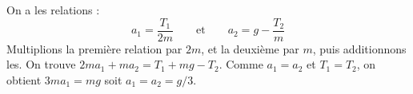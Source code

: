 
\begin{corrige}
	On a les relations : 
	\[a_1=\frac{T_1}{2m}
	\qquad\text{et}\qquad
	a_2=g-\frac{T_2}{m}\]
	Multiplions la première relation par $2m$, et la deuxième par $m$, puis additionnons les. On trouve $2ma_1+ma_2=T_1+mg-T_2$. Comme $a_1=a_2$ et $T_1=T_2$, on obtient $3ma_1=mg$ soit $a_1=a_2=g/3$.
\end{corrige}



\finEntrainement






\afficheReponsesMelangees

\finFicheEntrainement                                                                        %




\ifdefined\mainIsLoaded\else
\printReponsesEtCorriges
\fi
